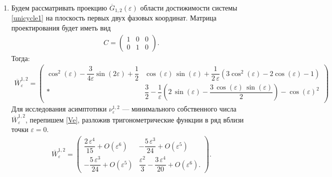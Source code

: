 \documentclass[../main.tex]{subfiles}
\begin{document}
 \begin{enumerate}
 \item Будем рассматривать проекцию $ \overline{G}_{1,2}(\varepsilon) $ области достижимости системы \eqref{unicycle1} на плоскость первых двух фазовых координат. 
Матрица проектирования будет иметь вид
 \begin{gather*}
 C = \begin{pmatrix}
 1 & 0 & 0 \\ 
 0 & 1 & 0 
 \end{pmatrix}. 
 \end{gather*} 
 Тогда: \small
 \begin{gather}\label{Ve}
 \overline{W}_{\varepsilon}^{1,2}= \begin{pmatrix}
 \cos^2(\varepsilon)-\dfrac{3}{4\varepsilon}\sin(2\varepsilon)+\dfrac{1}{2} & 
 \cos\left(\varepsilon \right)\,\sin\left(\varepsilon \right)+\dfrac{1}{2\,\varepsilon}\left( 3\cos^2\left(\varepsilon \right)-2\cos\left(\varepsilon\right)-1\right) \\[6pt]
 * &
 \dfrac{3}{2}-\dfrac{1}{\varepsilon }\left(2\,\sin\left(\varepsilon \right)-\dfrac{3\,\cos\left(\varepsilon \right)\,\sin\left(\varepsilon \right)}{2} \right) -{\cos\left(\varepsilon \right)}^2 
 \end{pmatrix}
 \end{gather}
 \normalsize
 Для исследования асимптотики $ \nu^{1,2}_{\varepsilon} $ --- минимального собственного числа $ \overline{W}_{\varepsilon}^{1,2} $, перепишем \eqref{Ve}, разложив тригонометрические функции в ряд вблизи точки $ \varepsilon = 0 $.
 \begin{gather*}
 \overline{W}_{\varepsilon}^{1,2} = \begin{pmatrix}
 \dfrac{2\,\varepsilon ^4}{15} + O(\varepsilon^6)&
 -\dfrac{5\,\varepsilon ^3}{24} + O(\varepsilon^5)\\[8pt]
 -\dfrac{5\,\varepsilon ^3}{24} + O(\varepsilon^5) & 
 \dfrac{\varepsilon ^2}{3}-\dfrac{3\,\varepsilon ^4}{20} + O(\varepsilon^6).
 \end{pmatrix}.
 \end{gather*}
 

\end{enumerate}
\end{document}
